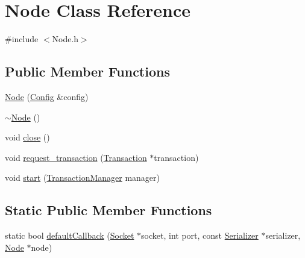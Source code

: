 \hypertarget{classNode}{}\section{Node Class Reference}
\label{classNode}


{\ttfamily \#include $<$Node.\+h$>$}

\subsection*{Public Member Functions}
\begin{DoxyCompactItemize}
\item 
\mbox{\hyperlink{classNode_a08648d758d45b9dc38de5731c5b83b51}{Node}} (\mbox{\hyperlink{classConfig}{Config}} \&config)
\item 
\mbox{\hyperlink{classNode_aa0840c3cb5c7159be6d992adecd2097c}{$\sim$\+Node}} ()
\item 
void \mbox{\hyperlink{classNode_af8cfc7b3fb2f102914daa5fc3b9c52f6}{close}} ()
\item 
void \mbox{\hyperlink{classNode_a3a3c8197be701cb23a3c9b2a2c981e94}{request\+\_\+transaction}} (\mbox{\hyperlink{classTransaction}{Transaction}} $\ast$transaction)
\item 
void \mbox{\hyperlink{classNode_ade99d966ef536d445f562fa5023ef7f5}{start}} (\mbox{\hyperlink{classTransactionManager}{Transaction\+Manager}} manager)
\end{DoxyCompactItemize}
\subsection*{Static Public Member Functions}
\begin{DoxyCompactItemize}
\item 
static bool \mbox{\hyperlink{classNode_ace919d11ac3ed1853da42eb35602b95b}{default\+Callback}} (\mbox{\hyperlink{classSocket}{Socket}} $\ast$socket, int port, const \mbox{\hyperlink{classSerializer}{Serializer}} $\ast$serializer, \mbox{\hyperlink{classNode}{Node}} $\ast$node)
\end{DoxyCompactItemize}
